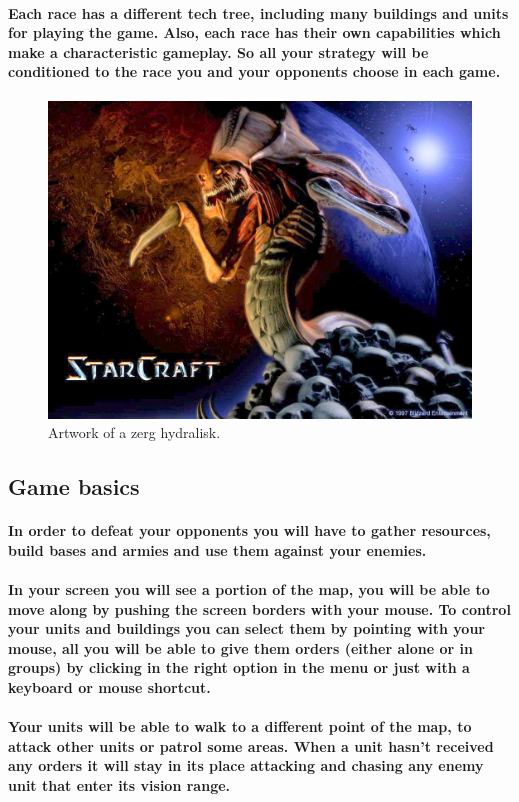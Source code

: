 \documentclass[a4paper,10pt]{article}
\newcommand{\p}[1]{\paragraph{\indent\textnormal{#1}}}
\begin{document}
    \p{Each race has a different tech tree, including many buildings and units for playing the game. Also, each race has their own capabilities which make a characteristic gameplay. So all your strategy will be conditioned to the race you and your opponents choose in each game.}

  
  \begin{figure}[h]
  \begin{center}
  \includegraphics[scale=.3]{diapos1/hydralisk.jpg}
  \end{center}
  \caption{Artwork of a zerg hydralisk.}
  \label{fig:rb1}
  \end{figure}


  \subsection{Game basics}

    \p{In order to defeat your opponents you will have to gather resources, build bases and armies and use them against your enemies.}

    \p{In your screen you will see a portion of the map, you will be able to move along by pushing the screen borders with your mouse. To control your units and buildings you can select them by pointing with your mouse, all you will be able to give them orders (either alone or in groups) by clicking in the right option in the menu or just with a keyboard or mouse shortcut.}

    \p{Your units will be able to walk to a different point of the map, to attack other units or patrol some areas. When a unit hasn't received any orders it will stay in its place attacking and chasing any enemy unit that enter its vision range.}
\end{document}
